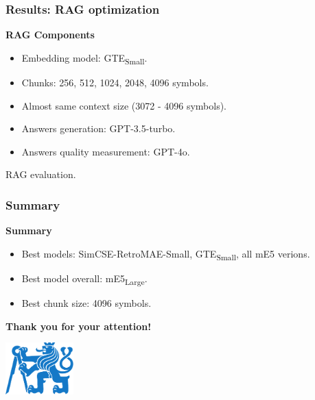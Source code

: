 \documentclass{beamer}
\newif\ifplacelogo
\begin{document}
\begin{frame}
  \frametitle{Results: RAG optimization}
  \textcolor{cvut_navy}{\textbf{RAG Components}}
  \begin{itemize}
    \item Embedding model: GTE\textsubscript{Small}.
    \item Chunks: 256, 512, 1024, 2048, 4096 symbols.
    \item Almost same context size (3072 - 4096 symbols).
    \item Answers generation: GPT-3.5-turbo.
    \item Answers quality measurement: GPT-4o.
  \end{itemize}
  
  \begin{table}
    
    \caption{RAG evaluation.}
  \end{table}
\end{frame}


\placelogofalse 
\begin{frame}
  \frametitle{Summary}
  \textcolor{cvut_navy}{\textbf{Summary}}
  \begin{itemize}
    \item Best models: SimCSE-RetroMAE-Small, GTE\textsubscript{Small}, all mE5 verions.
    \item Best model overall: mE5\textsubscript{Large}.
    \item Best chunk size: 4096 symbols.
  \end{itemize}
  \vspace{10px}
  \begin{center}
    \huge \textcolor{cvut_navy}{\textbf{Thank you for your attention!}}  
  \end{center}
  \vspace{10px}
  \begin{center}
    \includegraphics[height=2cm]{src/fig/pdfs/ctu_logo_blue_filled.pdf}
  \end{center}
\end{frame}
\end{document}
